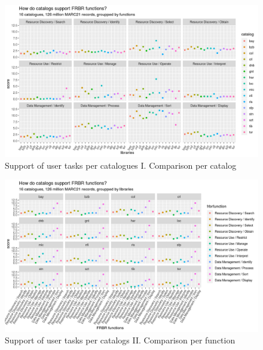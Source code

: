 \begin{figure}
\includegraphics[width=\textwidth]{images/chapter04/functional-analysis-of-catalogs-by-catalogs.png}
\caption{Support of user tasks per catalogues I. Comparison per catalog}
\label{figure:functions-by-catalogs}
\end{figure}

\begin{figure}
\includegraphics[width=\textwidth]{images/chapter04/functional-analysis-of-catalogs-by-functions.png}
\caption{Support of user tasks per catalogs II. Comparison per function}
\label{figure:functions-by-functions}
\end{figure}

